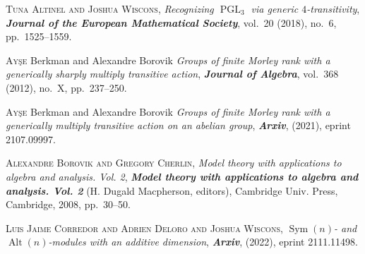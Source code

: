 \documentclass[bsl,meeting]{asl}
\begin{document}
\begin{thebibliography}{10}

{\scshape Tuna Alt{\i}nel and Joshua Wiscons},
{\itshape Recognizing {$\operatorname{PGL}_3$} via generic {$4$}-transitivity},
{\bfseries\itshape Journal of the European Mathematical Society},
vol.~20 (2018), no.~6, pp.~1525--1559.

{\scshape Ay\c{s}e } Berkman and  Alexandre Borovik 
{\itshape Groups of finite {M}orley rank with a generically sharply multiply transitive action},
{\bfseries\itshape Journal of Algebra},
vol.~368 (2012), no.~X, pp.~237--250.

{\scshape Ay\c{s}e } Berkman and  Alexandre Borovik 
{\itshape Groups of finite {M}orley rank with a generically multiply transitive action on an abelian group},
{\bfseries\itshape Arxiv},
(2021), eprint 2107.09997.

{\scshape Alexandre Borovik and Gregory Cherlin},
{\itshape Model theory with applications to algebra and analysis. {V}ol. 2},
{\bfseries\itshape Model theory with applications to algebra and analysis. {V}ol. 2}
(H. Dugald Macpherson, editors),
Cambridge Univ. Press,
Cambridge,
2008,
pp.~30--50.

{\scshape Luis Jaime Corredor and Adrien Deloro and Joshua Wiscons},
{\itshape {$\operatorname{Sym}(n)$}- and {$\operatorname{Alt}(n)$}-modules with an additive dimension},
{\bfseries\itshape Arxiv},
 (2022), eprint 2111.11498.


\end{thebibliography}


\vspace*{-0.5\baselineskip}
\end{document}
